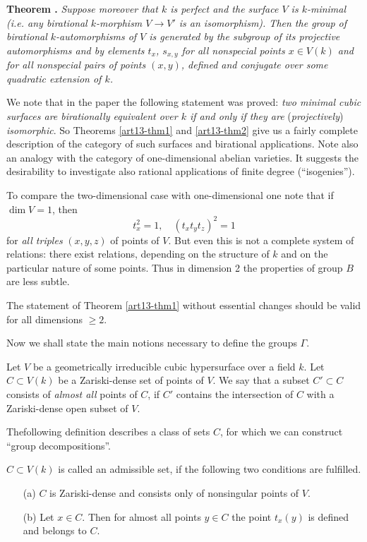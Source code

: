 \medskip
\noindent
{\bf Theorem .\label{art13-thm2}}
{\em Suppose moreover that $k$ is perfect and the surface $V$ is $k$-minimal (i.e. any birational $k$-morphism $V\to V'$ is an isomorphism). Then the group of birational $k$-automorphisms of $V$ is generated by the subgroup of its projective automorphisms and by elements $t_{x}$, $s_{x,y}$ for all nonspecial points $x\in V(k)$ and for all nonspecial pairs of points $(x,y)$, defined and conjugate over some quadratic extension of $k$.}
\smallskip

We note that in the paper \cite{art13-key2} the following statement was proved: {\em two minimal cubic surfaces are birationally equivalent over $k$ if and only if they are} ({\em projectively}) {\em isomorphic}. So Theorems \ref{art13-thm1} and \ref{art13-thm2} give us a fairly complete description of the category of such surfaces and birational applications. Note also an analogy with the category of one-dimensional abelian varieties. It suggests the desirability to investigate also rational applications of finite degree (``isogenies'').

To compare the two-dimensional case with one-dimensional one note that if $\dim V=1$, then
\begin{equation*}
t^{2}_{x}=1,\quad (t_{x}t_{y}t_{z})^{2}=1\tag{2}\label{art13-eq2}
\end{equation*}
for {\em all triples} $(x,y,z)$ of points of $V$. But even this is not a complete system of relations: there exist relations, depending on the structure of $k$ and on the particular nature of some points. Thus in dimension 2 the properties of group $B$ are less subtle.

The statement of Theorem \ref{art13-thm1} without essential changes should be valid for all dimensions $\geq 2$.

Now we shall state the main notions necessary to define the groups $\Gamma$.

Let $V$ be a geometrically irreducible cubic hypersurface over a field $k$. Let $C\subset V(k)$ be a Zariski-dense set of points of $V$. We say that a subset $C'\subset C$ consists of {\em almost all} points of $C$, if $C'$ contains the intersection of $C$ with a Zariski-dense open subset of $V$.

The\pageoriginale following definition describes a class of sets $C$, for which we can construct ``group decompositions''.

\begin{defi*}
$C\subset V(k)$ is called an admissible set, if the following two conditions are fulfilled.
\begin{itemize}
\item[\rm(a)] $C$ is Zariski-dense and consists only of nonsingular points of $V$.

\item[\rm(b)] Let $x\in C$. Then for almost all points $y\in C$ the point $t_{x}(y)$ is defined and belongs to $C$.
\end{itemize}
\end{defi*}

